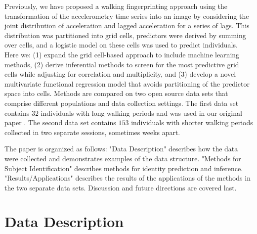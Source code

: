 Previously, we have proposed a walking fingerprinting approach \cite{koffman_fingerprinting_2023} using the transformation of the accelerometry time series into an image by considering the joint distribution of acceleration and lagged acceleration for a series of lags. This distribution was partitioned into grid cells, predictors were derived by summing over cells, and a logistic model on these cells was used to predict individuals. Here we: (1) expand the grid cell-based approach to include machine learning methods, (2) derive inferential methods to screen for the most predictive grid cells while adjusting for correlation and multiplicity, and (3) develop a novel multivariate functional regression model that avoids partitioning of the predictor space into cells. Methods are compared on two open source data sets that comprise different populations and data collection settings. The first data set contains $32$ individuals with long walking periods and was used in our original paper \cite{koffman_fingerprinting_2023}. The second data set contains $153$ individuals with shorter walking periods collected in two separate sessions, sometimes weeks apart. 

The paper is organized as follows: "Data Description" describes how the data were collected and demonstrates examples of the data structure. "Methods for Subject Identification" describes methods for identity prediction and inference. "Results/Applications" describes the results of the applications of the methods in the two separate data sets. Discussion and future directions are covered last.

\section{Data Description}\label{sec:data_description}



